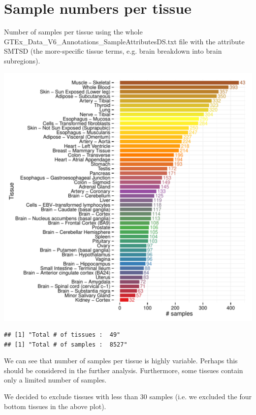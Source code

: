 \documentclass{article}\usepackage[]{graphicx}\usepackage[]{color}
\makeatletter
\def\maxwidth{ %
  \ifdim\Gin@nat@width>\linewidth
    \linewidth
  \else
    \Gin@nat@width
  \fi
}
\newenvironment{kframe}{%
 \def\at@end@of@kframe{}%
 \ifinner\ifhmode%
  \def\at@end@of@kframe{\end{minipage}}%
  \begin{minipage}{\columnwidth}%
 \fi\fi%
 \def\FrameCommand##1{\hskip\@totalleftmargin \hskip-\fboxsep
 \colorbox{shadecolor}{##1}\hskip-\fboxsep
     \hskip-\linewidth \hskip-\@totalleftmargin \hskip\columnwidth}%
 \MakeFramed {\advance\hsize-\width
   \@totalleftmargin\z@ \linewidth\hsize
   \@setminipage}}%
 {\par\unskip\endMakeFramed%
 \at@end@of@kframe}
\newenvironment{knitrout}{}{} %
\makeatother
\begin{document}
\section{Sample numbers per tissue}

Number of samples per tissue using the whole GTEx\_Data\_V6\_Annotations\_SampleAttributesDS.txt
file with the attribute SMTSD (the more-specific tissue terms, e.g. brain breakdown into brain subregions).

\begin{knitrout}
\color{fgcolor}
\includegraphics[width=\maxwidth]{figure/samples_per_tissue-1} 
\begin{kframe}\begin{verbatim}
## [1] "Total # of tissues :  49"
## [1] "Total # of samples :  8527"
\end{verbatim}
\end{kframe}
\end{knitrout}

We can see that number of samples per tissue is highly variable. Perhaps this should be considered in the further analysis. Furthermore, some tissues contain only a limited number of samples. \par
We decided to exclude tissues with less than 30 samples (i.e. we excluded the four bottom tissues in the above plot).
\end{document}
